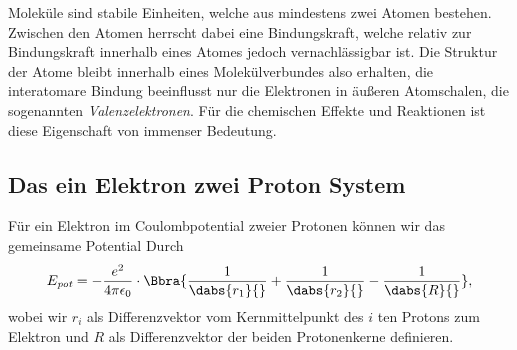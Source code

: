 \documentclass{subfiles}
\begin{document}

    Moleküle sind stabile Einheiten, welche aus mindestens zwei Atomen bestehen. Zwischen den Atomen herrscht dabei eine Bindungskraft, welche relativ zur Bindungskraft innerhalb eines Atomes jedoch vernachlässigbar ist. Die Struktur der Atome bleibt innerhalb eines Molekülverbundes also erhalten, die interatomare Bindung beeinflusst nur die Elektronen in äußeren Atomschalen, die sogenannten \emph{Valenzelektronen}. Für die chemischen Effekte und Reaktionen ist diese Eigenschaft von immenser Bedeutung. 

    \subsection{Das ein Elektron zwei Proton System}
        Für ein Elektron im Coulombpotential zweier Protonen können wir das gemeinsame Potential Durch
        \[
            E_\textit{pot} = -\frac{e^2}{4\pi\epsilon_0}\cdot\Bbra{\frac{1}{\dabs{r_1}{}} + \frac{1}{\dabs{r_2}{}} - \frac{1}{\dabs{R}{}}},
        \]
        wobei wir $r_i$ als Differenzvektor vom Kernmittelpunkt des $i$ ten Protons zum Elektron und $R$ als Differenzvektor der beiden Protonenkerne definieren. 
\end{document}

